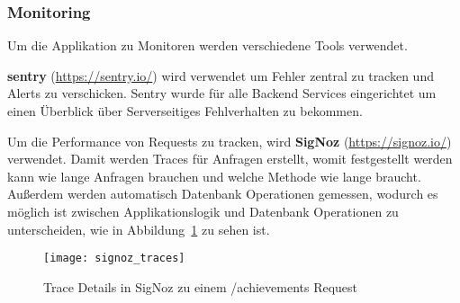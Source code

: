 \subsubsection{Monitoring}

Um die Applikation zu Monitoren werden verschiedene Tools verwendet.

\textbf{sentry} (\href{https://sentry.io/}{https://sentry.io/}) wird verwendet um Fehler zentral zu tracken und
Alerts zu verschicken.
Sentry wurde für alle Backend Services eingerichtet um einen Überblick über Serverseitiges Fehlverhalten zu bekommen.

Um die Performance von Requests zu tracken, wird \textbf{SigNoz} (\href{https://signoz.io/}{https://signoz.io/}) verwendet.
Damit werden Traces für Anfragen erstellt, womit festgestellt werden kann wie lange Anfragen brauchen und welche Methode wie lange braucht.
Außerdem werden automatisch Datenbank Operationen gemessen, wodurch es möglich ist zwischen Applikationslogik
und Datenbank Operationen zu unterscheiden, wie in Abbildung~\ref{fig:signoz-traces} zu sehen ist.
\begin{figure}
    \centering
    \texttt{[image: signoz\_traces]}
    \caption{Trace Details in SigNoz zu einem /achievements Request}
    \label{fig:signoz-traces}
\end{figure}